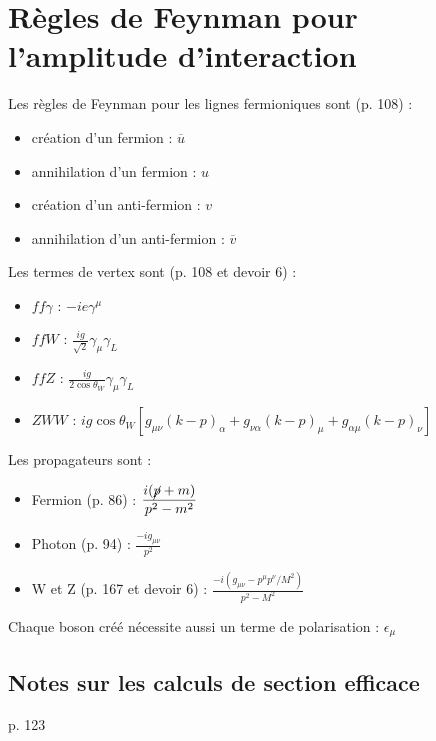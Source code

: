 \documentclass[12pt]{article}
\begin{document}
\section{Règles de Feynman pour l'amplitude d'interaction}

\hfill \break
Les règles de Feynman pour les lignes fermioniques sont (p. 108) :

\begin{itemize}
  \item création d'un fermion : $\overline{u}$
  \item annihilation d'un fermion : $u$
  \item création d'un anti-fermion : $v$
  \item annihilation d'un anti-fermion : $\overline{v}$
\end{itemize}

\hfill \break
Les termes de vertex sont (p. 108 et devoir 6) :

\begin{itemize}
  \item $ff\gamma$ : $-ie\gamma^\mu$
  \item $ffW$ : $\displaystyle \frac{ig}{\sqrt{2}} \gamma_\mu \gamma_L$
  \item $ffZ$ : $\displaystyle \frac{ig}{2 \cos{\theta}_W} \gamma_\mu \gamma_L$
  \item $ZWW$ : $ig\cos{\theta}_W [ g_{\mu\nu}(k-p)_\alpha +  g_{\nu\alpha}(k-p)_\mu +  g_{\alpha\mu}(k-p)_\nu]$
\end{itemize}

\hfill \break
Les propagateurs sont :

\begin{itemize}
  \item Fermion (p. 86) : $\displaystyle \frac{i(\cancel{p} + m)}{p^2 - m^2}$
  \item Photon (p. 94) : $\displaystyle \frac{-i g_{\mu\nu}}{p^2}$
  \item W et Z (p. 167 et devoir 6) : $\displaystyle \frac{-i(g_{\mu\nu} - p^\mu p^\nu/M^2)}{p^2-M^2}$
\end{itemize}

\hfill \break
Chaque boson créé nécessite aussi un terme de polarisation : $\epsilon_\mu$

\subsection{Notes sur les calculs de section efficace}

p. 123
\end{document}
